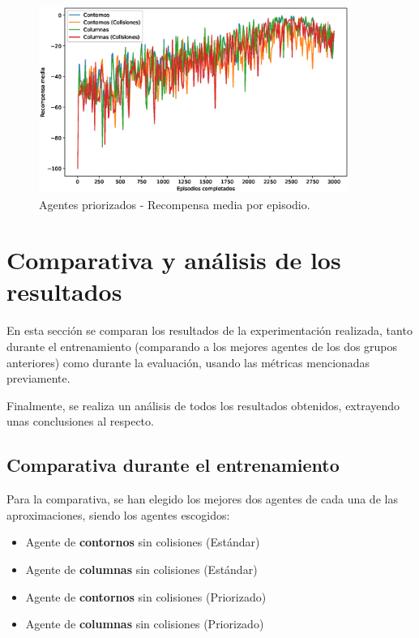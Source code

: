 \begin{figure}[h]
    \centering
    \includegraphics[width=0.9\textwidth]{imagenes/cap6/prioritized/smoothed_rewards.eps}
    \caption{Agentes priorizados - Recompensa media por episodio.}
    \label{fig:chap6-prioritized-rewards}
\end{figure}

\section{Comparativa y análisis de los resultados}

En esta sección se comparan los resultados de la experimentación realizada, tanto durante el entrenamiento (comparando a los mejores agentes de los dos grupos anteriores) como durante la evaluación, usando las métricas mencionadas previamente.

Finalmente, se realiza un análisis de todos los resultados obtenidos, extrayendo unas conclusiones al respecto.

\subsection{Comparativa durante el entrenamiento}

Para la comparativa, se han elegido los mejores dos agentes de cada una de las aproximaciones, siendo los agentes escogidos:
\begin{itemize}
	\item Agente de \textbf{contornos} sin colisiones (Estándar)
	\item Agente de \textbf{columnas} sin colisiones (Estándar)
	\item Agente de \textbf{contornos} sin colisiones (Priorizado)
	\item Agente de \textbf{columnas} sin colisiones (Priorizado)
\end{itemize}

